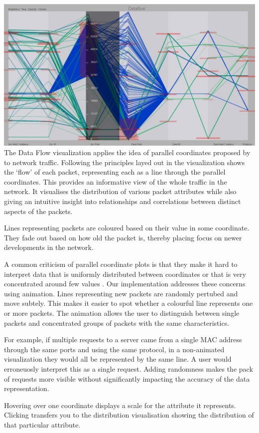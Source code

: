 \includegraphics[width=\linewidth]{materials/dataflow.jpg}
The Data Flow visualization applies the idea of parallel coordinates proposed by \cite{inselberg1985plane} to network traffic. Following the principles layed out in \cite{fliggnetwork} the visualization shows the `flow' of each packet, representing each as a line through the parallel coordinates. This provides an informative view of the whole traffic in the network. It visualises the distribution of various packet attributes while also giving an intuitive insight into relationships and correlations between distinct aspects of the packets.

Lines representing packets are coloured based on their value in some coordinate. They fade out based on how old the packet is, thereby placing focus on newer developments in the network. 

A common criticism of parallel coordinate plots is that they make it hard to interpret data that is uniformly distributed between coordinates or that is very concentrated around few values \cite{marty2009applied}. Our implementation addresses these concerns using animation. Lines representing new packets are randomly pertubed and move subtely. This makes it easier to spot whether a colourful line represents one or more packets. The animation allows the user to distinguish between single packets and concentrated groups of packets with the same characteristics.

For example, if multiple requests to a server came from a single MAC address through the same ports and using the same protocol, in a non-animated visualization they would all be represented by the same line. A user would erroneuosly interpret this as a single request. Adding randomness makes the pack of requests more visible without significantly impacting the accuracy of the data representation.

Hovering over one coordinate displays a scale for the attribute it represents. Clicking transfers you to the distribution visualisation showing the distribution of that particular attribute.

